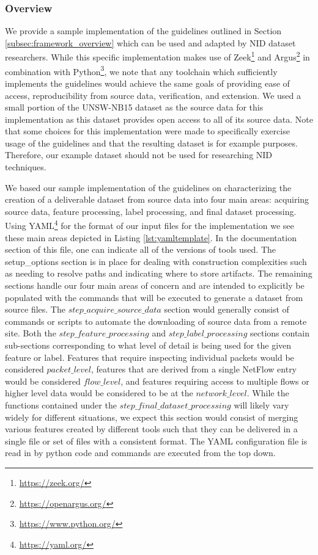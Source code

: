\documentclass[sigconf, anonymous, screen, review]{acmart}
\begin{document}
\subsubsection{Overview}\label{subsubsec:sample_overview}
We provide a sample implementation of the guidelines outlined in Section \ref{subsec:framework_overview} which can be used and adapted by NID dataset researchers.
While this specific implementation makes use of Zeek\footnote{\url{https://zeek.org/}} and Argus\footnote{\url{https://openargus.org/}} in combination with Python\footnote{\url{https://www.python.org/}}, we note that any toolchain which sufficiently implements the guidelines would achieve the same goals of providing ease of access, reproducibility from source data, verification, and extension.
We used a small portion of the UNSW-NB15 dataset \cite{unswnb15} as the source data for this implementation as this dataset provides open access to all of its source data.
Note that some choices for this implementation were made to specifically exercise usage of the guidelines and that the resulting dataset is for example purposes.
Therefore, our example dataset should not be used for researching NID techniques.

We based our sample implementation of the guidelines on characterizing the creation of a deliverable dataset from source data into four main areas:  acquiring source data, feature processing, label processing, and final dataset processing.
Using YAML\footnote{\url{https://yaml.org/}} for the format of our input files for the implementation we see these main areas depicted in Listing \ref{lst:yamltemplate}.
In the documentation section of this file, one can indicate all of the versions of tools used.
The setup\_options section is in place for dealing with construction complexities such as needing to resolve paths and indicating where to store artifacts.
The remaining sections handle our four main areas of concern and are intended to explicitly be populated with the commands that will be executed to generate a dataset from source files.
The $step\_acquire\_source\_data$ section would generally consist of commands or scripts to automate the downloading of source data from a remote site.
Both the $step\_feature\_processing$ and $step\_label\_processing$ sections contain sub-sections corresponding to what level of detail is being used for the given feature or label.
Features that require inspecting individual packets would be considered $packet\_level$, features that are derived from a single NetFlow entry would be considered $flow\_level$, and features requiring access to multiple flows or higher level data would be considered to be at the $network\_level$.
While the functions contained under the $step\_final\_dataset\_processing$ will likely vary widely for different situations, we expect this section would consist of merging various features created by different tools such that they can be delivered in a single file or set of files with a consistent format.
The YAML configuration file is read in by python code and commands are executed from the top down.
\end{document}
